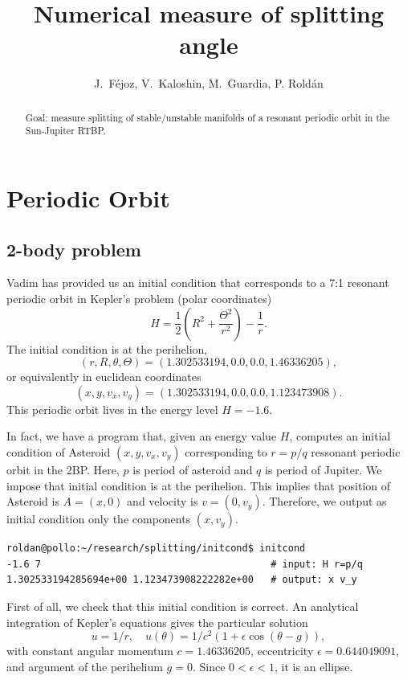 \documentclass[a4paper]{amsart}
\theoremstyle{remark}
\begin{document}
\title{Numerical measure of splitting angle}
\author{J.~F\'ejoz, V.~Kaloshin, M.~Guardia, P. Rold\'an}

\begin{abstract}
Goal: measure splitting of stable/unstable manifolds of a resonant periodic
orbit in the Sun-Jupiter RTBP.
\end{abstract}
\maketitle

\section{Periodic Orbit} \label{sec:periodic_orbit}

\subsection{2-body problem}

Vadim has provided us an initial condition that corresponds to a 7:1 resonant
periodic orbit in Kepler's problem (polar coordinates)
\[ H=\frac{1}{2}(R^2+\frac{\Theta^2}{r^2})-\frac{1}{r}. \]
The initial condition is at the perihelion,
\[(r,R,\theta,\Theta)=(1.302533194, 0.0, 0.0, 1.46336205),\]
or equivalently in euclidean coordinates
\[(x,y,v_x,v_y)=(1.302533194, 0.0, 0.0, 1.123473908).\]
This periodic orbit lives in the energy level $H=-1.6$.

In fact, we have a program that, given an energy value $H$, computes an initial
condition of Asteroid $(x,y,v_x,v_y)$ corresponding to $r=p/q$ ressonant
periodic orbit in the 2BP. 
Here, $p$ is period of asteroid and $q$ is period of Jupiter.
We impose that initial condition is at the perihelion. This implies that
position of Asteroid is $A=(x,0)$ and velocity is $v=(0,v_y)$.
Therefore, we output as initial condition only the components
$(x,v_y)$.

\begin{verbatim}
roldan@pollo:~/research/splitting/initcond$ initcond 
-1.6 7                                        # input: H r=p/q
1.302533194285694e+00 1.123473908222282e+00   # output: x v_y
\end{verbatim}

First of all, we check that this initial condition is correct. An analytical
integration of Kepler's equations gives the particular solution
\[ u=1/r, \quad u(\theta)=1/c^2(1+\epsilon \cos(\theta-g)), \]
with constant angular momentum $c=1.46336205$, eccentricity $\epsilon =
0.644049091$, and argument of the perihelium $g=0$.
Since $0<\epsilon<1$, it is an ellipse.
\end{document}
